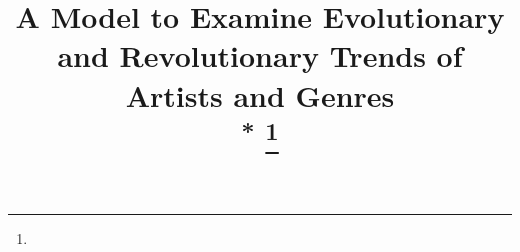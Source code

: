 \documentclass[conference]{IEEEtran}
\begin{document}
\title{A Model to Examine Evolutionary and Revolutionary Trends of Artists and Genres\\
{\footnotesize \textsuperscript{*}}
\thanks{}
}

\author{\IEEEauthorblockN{Lizhang Chen}

}
\end{document}

